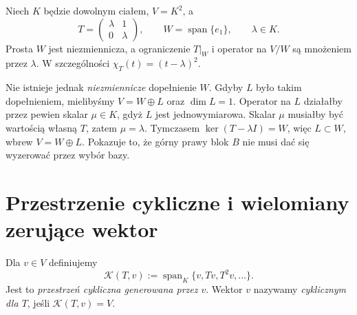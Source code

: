 \begin{przyklad}
\label{prz:lin16-no-invariant-complement}
Niech \(K\) będzie dowolnym ciałem,
\(V=K^2\), a
\[
 T=\begin{pmatrix}\lambda&1\\0&\lambda\end{pmatrix},
 \qquad W=\operatorname{span}\{e_1\},
 \qquad\lambda\in K.
\]
Prosta \(W\) jest niezmiennicza,
a ograniczenie \(T|_W\) i operator
na \(V/W\) są mnożeniem przez \(\lambda\).
W szczególności \(\chi_T(t)=(t-\lambda)^2\).

Nie istnieje jednak
\emph{niezmiennicze} dopełnienie \(W\).
Gdyby \(L\) było takim dopełnieniem,
mielibyśmy \(V=W\oplus L\)
oraz \(\dim L=1\).
Operator na \(L\) działałby
przez pewien skalar \(\mu\in K\),
gdyż \(L\) jest jednowymiarowa.
Skalar \(\mu\) musiałby być wartością własną
\(T\), zatem \(\mu=\lambda\).
Tymczasem \(\ker(T-\lambda I)=W\),
więc \(L\subset W\), wbrew \(V=W\oplus L\).
Pokazuje to, że górny prawy blok \(B\)
nie musi dać się wyzerować przez wybór bazy.
\end{przyklad}

\section{Przestrzenie cykliczne i wielomiany zerujące wektor}
\label{sec:lin16-cyclic}

\begin{definicja}
\label{def:lin16-cyclic}
Dla \(v\in V\) definiujemy
\[
 \mathcal K(T,v):=
 \operatorname{span}_K\{v,Tv,T^2v,\ldots\}.
\]
Jest to \emph{przestrzeń cykliczna generowana przez \(v\)}.
Wektor \(v\) nazywamy \emph{cyklicznym dla \(T\)},
jeśli \(\mathcal K(T,v)=V\).
\end{definicja}

